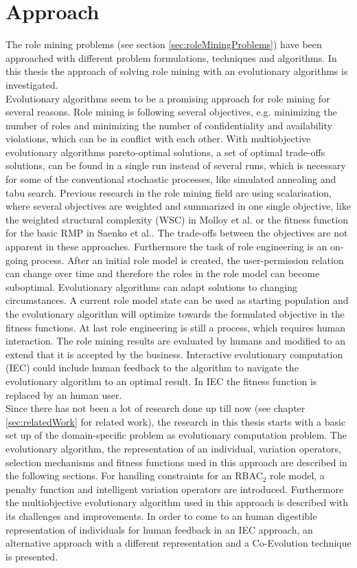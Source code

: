\newpage
\section{Approach}
The role mining problems (see section \ref{sec:roleMiningProblems}) have been approached with different problem formulations, techniques and algorithms. In this thesis the approach of solving role mining with an evolutionary algorithms is investigated.\\
Evolutionary algorithms seem to be a promising approach for role mining for several reasons. Role mining is following several objectives, e.g. minimizing the number of roles and minimizing the number of confidentiality and availability violations, which can be in conflict with each other. With multiobjective evolutionary algorithms pareto-optimal solutions, a set of optimal trade-offs solutions, can be found in a single run instead of several runs, which is necessary for some of the conventional stochastic processes, like simulated annealing and tabu search\cite{abraham2005evolutionary}. Previous research in the role mining field are using scalarisation, where several objectives are weighted and summarized in one single objective, like the weighted structural complexity (WSC) in Molloy et al.\cite{Molloy} or the fitness function for the basic RMP in Saenko et al.\cite{saenko2012design}. The trade-offs between the objectives are not apparent in these approaches. Furthermore the task of role engineering is an on-going process. After an initial role model is created, the user-permission relation can change over time and therefore the roles in the role model can become suboptimal. Evolutionary algorithms can adapt solutions to changing circumstances\cite{Fogel:1997}. A current role model state can be used as starting population and the evolutionary algorithm will optimize towards the formulated objective in the fitness functions. At last role engineering is still a process, which requires human interaction. The role mining results are evaluated by humans and modified to an extend that it is accepted by the business. Interactive evolutionary computation (IEC)\cite{949485} could include human feedback to the algorithm to navigate the evolutionary algorithm to an optimal result. In IEC the fitness function is replaced by an human user.\\
Since there has not been a lot of research done up till now (see chapter \ref{sec:relatedWork} for related work), the research in this thesis starts with a basic set up of the domain-specific problem as evolutionary computation problem. The evolutionary algorithm, the representation of an individual, variation operators, selection mechanisms and fitness functions used in this approach are described in the following sections. For handling constraints for an RBAC$_2$ role model, a penalty function and intelligent variation operators are introduced. Furthermore the multiobjective evolutionary algorithm used in this approach is described with its challenges and improvements. In order to come to an human digestible representation of individuals for human feedback in an IEC approach, an alternative approach with a different representation and a Co-Evolution technique is presented.

